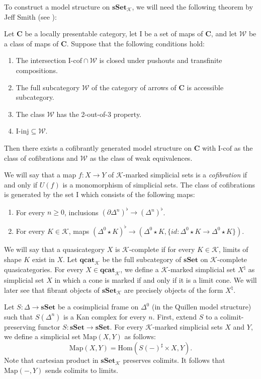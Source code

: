 \documentclass[reqno]{amsart}
\theoremstyle{definition}
\theoremstyle{remark}
\newcommand{\cat}[1]{\mathbf{#1}}
\newcommand{\C}{\cat{C}}
\newcommand{\sSet}{\cat{sSet}}
\newcommand{\K}{$\mathcal{K}$}
\newcommand{\csSet}{\sSet_\mathcal{K}}
\newcommand{\cqCat}{\cat{qcat}_\mathcal{K}}
\newcommand{\join}{\star}
\newcommand{\Hom}{\mathrm{Hom}}
\newcommand{\Map}{\mathrm{Map}}
\newcommand{\we}{\mathcal{W}}
\newcommand{\I}{\mathrm{I}}
\newcommand{\class}[2]{#1\text{-}\mathrm{#2}}
\newcommand{\Icof}[1][\I]{\class{#1}{cof}}
\newcommand{\Iinj}[1][\I]{\class{#1}{inj}}
\numberwithin{figure}{section}
\begin{document}
To construct a model structure on $\csSet$, we will need the following theorem by Jeff Smith (see \cite[Proposition~A.2.6.8]{lurie-topos}):
\begin{thm}
Let $\C$ be a locally presentable category, let $\I$ be a set of maps of $\C$, and let $\we$ be a class of maps of $\C$.
Suppose that the following conditions hold:
\begin{enumerate}
\item The intersection $\Icof \cap \we$ is closed under pushouts and transfinite compositions.
\item The full subcategory $\we$ of the category of arrows of $\C$ is accessible subcategory.
\item The class $\we$ has the 2-out-of-3 property.
\item $\Iinj \subseteq \we$.
\end{enumerate}
Then there exists a cofibrantly generated model structure on $\C$ with $\Icof$ as the class of cofibrations and $\we$ as the class of weak equivalences.
\end{thm}

We will say that a map $f : X \to Y$ of \K-marked simplicial sets is a \emph{cofibration} if and only if $U(f)$ is a monomorphism of simplicial sets. 
The class of cofibrations is generated by the set $\I$ which consists of the following maps:
\begin{enumerate}
\item For every $n \geq 0$, inclusions $(\partial \Delta^n)^\flat \to (\Delta^n)^\flat$.
\item For every $K \in \mathcal{K}$, maps $(\Delta^0 \join K)^\flat \to (\Delta^0 \join K, \{ id : \Delta^0 \join K \to \Delta^0 \join K \})$.
\end{enumerate}

We will say that a quasicategory $X$ is \K-complete if for every $K \in \mathcal{K}$, limits of shape $K$ exist in $X$.
Let $\cqCat$ be the full subcategory of $\sSet$ on \K-complete quasicategories.
For every $X \in \cqCat$, we define a \K-marked simplicial set $X^\natural$ as simplicial set $X$ in which a cone is marked if and only if it is a limit cone.
We will later see that fibrant objects of $\csSet$ are precisely objects of the form $X^\natural$.

Let $S : \Delta \to \sSet$ be a cosimplicial frame on $\Delta^0$ (in the Quillen model structure) such that $S(\Delta^n)$ is a Kan complex for every $n$.
First, extend $S$ to a colimit-preserving functor $S : \sSet \to \sSet$.
For every \K-marked simplicial sets $X$ and $Y$, we define a simplicial set $\Map(X,Y)$ as follows:
\[ \Map(X,Y) = \Hom(S(-)^\sharp \times X, Y). \]
Note that cartesian product in $\csSet$ preserves colimits.
It follows that $\Map(-,Y)$ sends colimits to limits.
\end{document}
